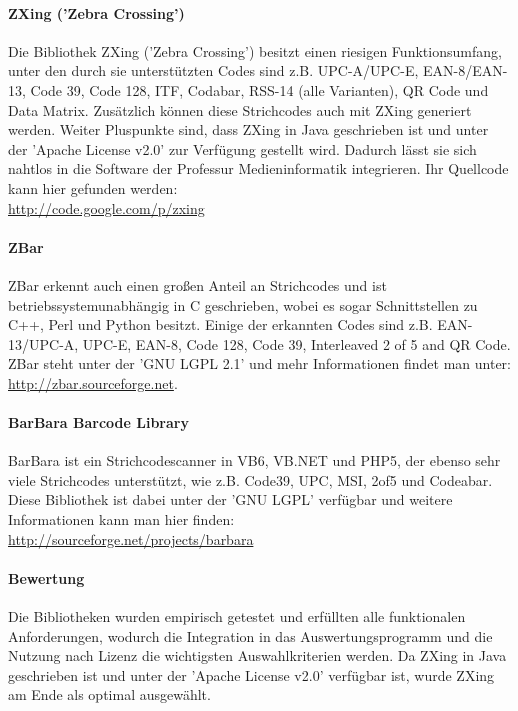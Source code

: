 \paragraph*{ZXing ('Zebra Crossing')}
\label{par:zxing}
Die Bibliothek ZXing ('Zebra Crossing') besitzt einen riesigen Funktionsumfang, unter den durch sie unterstützten Codes sind z.B. UPC-A/UPC-E, EAN-8/EAN-13, Code 39, Code 128, ITF, Codabar, RSS-14 (alle Varianten), QR Code und Data Matrix. Zusätzlich können diese Strichcodes auch mit ZXing generiert werden. Weiter Pluspunkte sind, dass ZXing in Java geschrieben ist und unter der 'Apache License v2.0' zur Verfügung gestellt wird. Dadurch lässt sie sich nahtlos in die Software der Professur Medieninformatik integrieren. Ihr Quell\-code kann hier gefunden werden:\\
\url{http://code.google.com/p/zxing}

\paragraph*{ZBar}
ZBar erkennt auch einen großen Anteil an Strichcodes und ist betriebssystem\-unabhängig in C geschrieben, wobei es sogar Schnittstellen zu C++, Perl und Python besitzt. Einige der erkannten Codes sind z.B. EAN-13/UPC-A, UPC-E, EAN-8, Code 128, Code 39, Interleaved 2 of 5 and QR Code. ZBar steht unter der 'GNU LGPL 2.1' und mehr Informationen findet man unter:\\
\url{http://zbar.sourceforge.net}.

\paragraph*{BarBara Barcode Library}
BarBara ist ein Strichcodescanner in VB6, VB.NET und PHP5, der ebenso sehr viele Strichcodes unterstützt, wie z.B. Code39, UPC, MSI, 2of5 und Codeabar. Diese Bibliothek ist dabei unter der 'GNU LGPL' verfügbar und weitere Informationen kann man hier finden:\\
\url{http://sourceforge.net/projects/barbara}

\paragraph*{Bewertung}
Die Bibliotheken wurden empirisch getestet und erfüllten alle funktionalen Anforderungen, wodurch die Integration in das Auswertungsprogramm und die Nutzung nach Lizenz die wichtigsten Auswahlkriterien werden. Da ZXing in Java geschrieben ist und unter der 'Apache License v2.0' verfügbar ist, wurde ZXing am Ende als optimal ausgewählt.